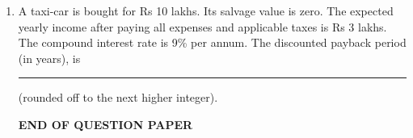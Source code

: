 \documentclass[12pt]{article}
\begin{document}
\begin{enumerate}[label=Q.\arabic*]
		\item A taxi-car is bought for Rs 10 lakhs. Its salvage value is zero. The expected yearly income after paying all expenses and applicable taxes is Rs 3 lakhs. The compound interest rate is 9\% per annum. The discounted payback period (in years), is \rule{3cm}{0.15mm} (rounded off to the next higher integer).

			\begin{center}
				\textbf{END OF QUESTION PAPER }
			\end{center}

	\end{enumerate}
\end{document}
